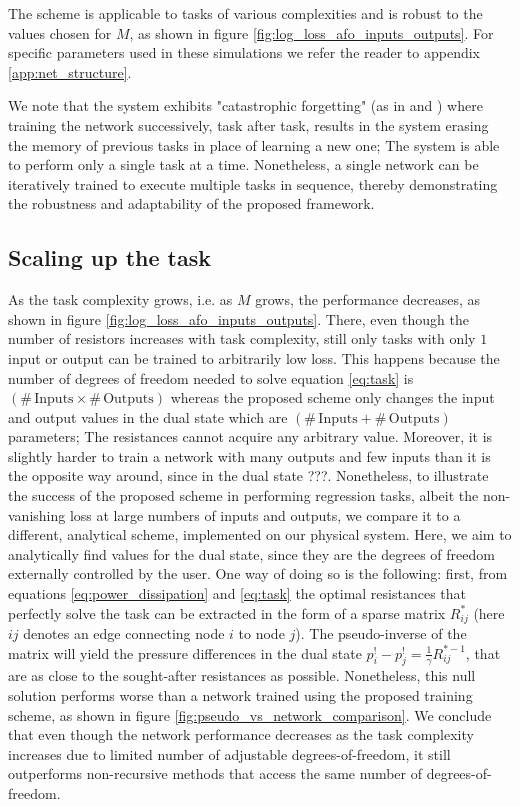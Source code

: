 \documentclass[%
 reprint,
 amsmath,amssymb,
 aps,
]{revtex4-2}
\begin{document}
{    The scheme is applicable to tasks of various complexities and is robust to the values chosen for $M$, as shown in figure \ref{fig:log_loss_afo_inputs_outputs}. For specific parameters used in these simulations we refer the reader to appendix \ref{app:net_structure}.
    
    We note that the system exhibits "catastrophic forgetting" (as in \cite{FRENCH1999128} and \cite{stern2020continual}) where training the network successively, task after task, results in the system erasing the memory of previous tasks in place of learning a new one; The system is able to perform only a single task at a time. Nonetheless, a single network can be iteratively trained to execute multiple tasks in sequence, thereby demonstrating the robustness and adaptability of the proposed framework.

\subsection{Scaling up the task}\label{sec:scaling_up}

    As the task complexity grows, i.e. as $M$ grows, the performance decreases, as shown in figure \ref{fig:log_loss_afo_inputs_outputs}. There, even though the number of resistors increases with task complexity, still only tasks with only $1$ input or output can be trained to arbitrarily low loss. This happens because the number of degrees of freedom needed to solve equation \ref{eq:task} is $\left(\# \, \text{Inputs}\times \# \, \text{Outputs}\right)$ whereas the proposed scheme only changes the input and output values in the dual state which are $\left(\# \, \text{Inputs}+\# \, \text{Outputs}\right)$ parameters; The resistances cannot acquire any arbitrary value. \textcolor{roie}{Moreover, it is slightly harder to train a network with many outputs and few inputs than it is the opposite way around, since in the dual state ???.} 
    Nonetheless, to illustrate the success of the proposed scheme in performing regression tasks, albeit the non-vanishing loss at large numbers of inputs and outputs, we compare it to a different, analytical scheme, implemented on our physical system. Here, we aim to analytically find values for the dual state, since they are the degrees of freedom externally controlled by the user. One way of doing so is the following: first, from equations \ref{eq:power_dissipation} and \ref{eq:task} the optimal resistances that perfectly solve the task can be extracted in the form of a sparse matrix $R_{ij}^*$ (here $ij$ denotes an edge connecting node $i$ to node $j$). The pseudo-inverse of the matrix will yield the pressure differences in the dual state $p_i^!-p_j^!=\frac{1}{\gamma}R_{ij}^{*-1}$, that are as close to the sought-after resistances as possible. 
    Nonetheless, this null solution performs worse than a network trained using the proposed training scheme, as shown in figure \ref{fig:pseudo_vs_network_comparison}. 
    We conclude that even though the network performance decreases as the task complexity increases due to limited number of adjustable degrees-of-freedom, it still outperforms non-recursive methods that access the same number of degrees-of-freedom.

}
\end{document}
